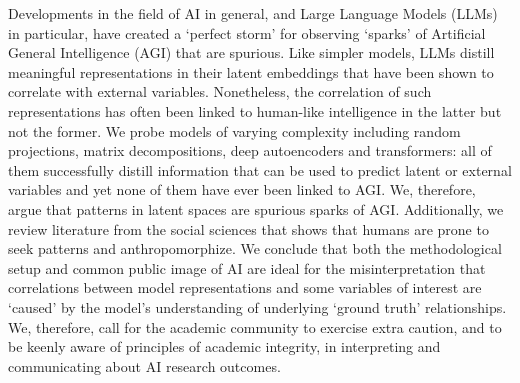 Developments in the field of AI in general, and Large Language Models (LLMs) in particular, have created a `perfect storm’ for observing `sparks’ of Artificial General Intelligence (AGI) that are spurious. Like simpler models, LLMs distill meaningful representations in their latent embeddings that have been shown to correlate with external variables. Nonetheless, the correlation of such representations has often been linked to human-like intelligence in the latter but not the former. We probe models of varying complexity including random projections, matrix decompositions, deep autoencoders and transformers: all of them successfully distill information that can be used to predict latent or external variables and yet none of them have ever been linked to AGI. We, therefore, argue that patterns in latent spaces are spurious sparks of AGI. Additionally, we review literature from the social sciences that shows that humans are prone to seek patterns and anthropomorphize. We conclude that both the methodological setup and common public image of AI are ideal for the misinterpretation that correlations between model representations and some variables of interest are `caused' by the model's understanding of underlying `ground truth’ relationships. We, therefore, call for the academic community to exercise extra caution, and to be keenly aware of principles of academic integrity, in interpreting and communicating about AI research outcomes.